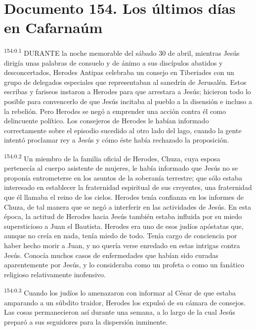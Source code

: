 \chapter{Documento 154. Los últimos días en Cafarnaúm}
\par 
\textsuperscript{154:0.1} DURANTE la noche memorable del sábado 30 de abril, mientras Jesús dirigía unas palabras de consuelo y de ánimo a sus discípulos abatidos y desconcertados, Herodes Antipas celebraba un consejo en Tiberiades con un grupo de delegados especiales que representaban al sanedrín de Jerusalén. Estos escribas y fariseos instaron a Herodes para que arrestara a Jesús; hicieron todo lo posible para convencerlo de que Jesús incitaba al pueblo a la disensión e incluso a la rebelión. Pero Herodes se negó a emprender una acción contra él como delincuente político. Los consejeros de Herodes le habían informado correctamente sobre el episodio sucedido al otro lado del lago, cuando la gente intentó proclamar rey a Jesús y cómo éste había rechazado la proposición.

\par 
\textsuperscript{154:0.2} Un miembro de la familia oficial de Herodes, Chuza, cuya esposa pertenecía al cuerpo asistente de mujeres, le había informado que Jesús no se proponía entrometerse en los asuntos de la soberanía terrestre; que sólo estaba interesado en establecer la fraternidad espiritual de sus creyentes, una fraternidad que él llamaba el reino de los cielos. Herodes tenía confianza en los informes de Chuza, de tal manera que se negó a interferir en las actividades de Jesús. En esta época, la actitud de Herodes hacia Jesús también estaba influida por su miedo supersticioso a Juan el Bautista. Herodes era uno de esos judíos apóstatas que, aunque no creía en nada, tenía miedo de todo. Tenía cargo de conciencia por haber hecho morir a Juan, y no quería verse enredado en estas intrigas contra Jesús. Conocía muchos casos de enfermedades que habían sido curadas aparentemente por Jesús, y lo consideraba como un profeta o como un fanático religioso relativamente inofensivo.

\par 
\textsuperscript{154:0.3} Cuando los judíos lo amenazaron con informar al César de que estaba amparando a un súbdito traidor, Herodes los expulsó de su cámara de consejos. Las cosas permanecieron así durante una semana, a lo largo de la cual Jesús preparó a sus seguidores para la dispersión inminente.

